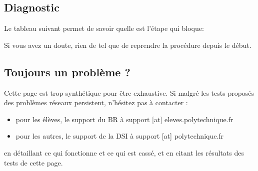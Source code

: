 \subsection{Diagnostic}
Le tableau suivant permet de savoir quelle est l'étape qui bloque:


Si vous avez un doute, rien de tel que de reprendre la procédure depuis le début.

\subsection{Toujours un problème ?}
Cette page est trop synthétique pour être exhaustive. Si malgré les tests proposés des problèmes réseaux persistent, n'hésitez pas à contacter :
\begin{itemize}
\item pour les élèves, le support du BR à support [at] eleves.polytechnique.fr
\item pour les autres, le support de la DSI à support [at] polytechnique.fr
\end{itemize}
en détaillant ce qui fonctionne et ce qui est cassé, et en citant les résultats des tests de cette page.
